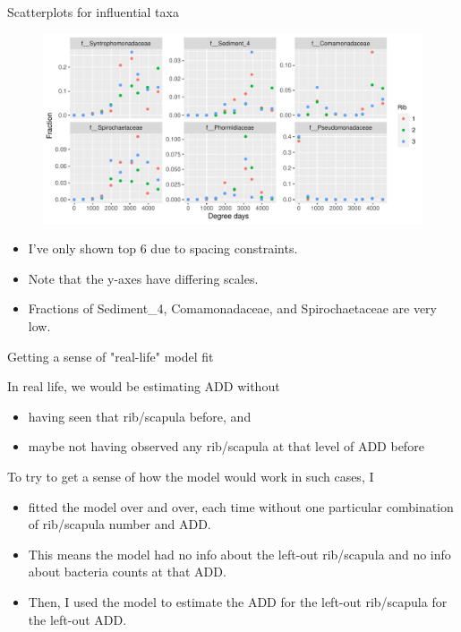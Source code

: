 \documentclass{beamer}
\begin{document}
\begin{frame}{Scatterplots for influential taxa}

  \begin{center}
    \begin{figure}
      \includegraphics[width=4.75in]{use_families/w_ribs/w_baseline/infl_rib_family_scatter}
    \end{figure}
  \end{center}
  \vspace{-0.25in}
  \scriptsize{
  \begin{itemize}
    \item I've only shown top 6 due to spacing constraints.
    \item Note that the y-axes have differing scales.
    \item Fractions of Sediment\_4, Comamonadaceae, and Spirochaetaceae are very
    low.
  \end{itemize}
  }

\end{frame}



\begin{frame}{Getting a sense of "real-life" model fit}

  \noindent In real life, we would be estimating ADD without
  \begin{itemize}
    \item having seen that rib/scapula before, and
    \item maybe not having observed any rib/scapula at that level of ADD before
  \end{itemize} 

  \vspace{0.1in}

  \noindent To try to get a sense of how the model would work in such cases, I
  \begin{itemize}
    \item fitted the model over and over, each time without one particular
    combination of rib/scapula number and ADD.
    \item This means the model had no info about the left-out rib/scapula and no
    info about bacteria counts at that ADD.
    \item Then, I used the model to estimate the ADD for the left-out
    rib/scapula for the left-out ADD.
  \end{itemize}
  
\end{frame}
\end{document}
